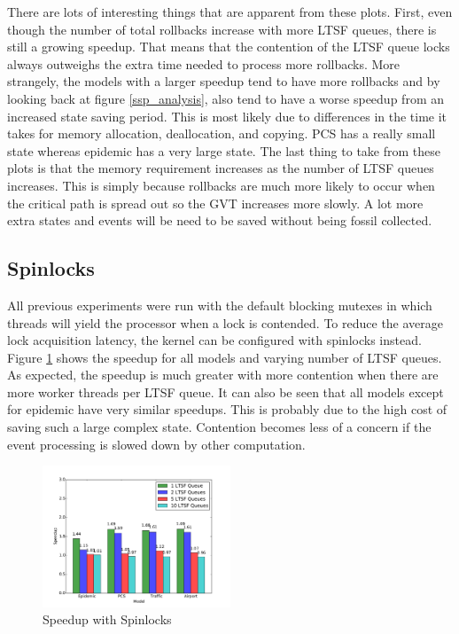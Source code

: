 \documentclass[11pt]{book}
\begin{document}
There are lots of interesting things that are apparent from these plots. First, even though
the number of total rollbacks increase with more LTSF queues, there is still a growing speedup.
That means that the contention of the LTSF queue locks always outweighs the extra time needed
to process more rollbacks. More strangely, the models with a larger speedup tend to have more
rollbacks and by looking back at figure \ref{ssp_analysis}, also tend to have a worse speedup
from an increased state saving period. This is most likely due to differences in the time it
takes for memory allocation, deallocation, and copying. PCS has a really small state whereas
epidemic has a very large state. The last thing to take from these plots is that the memory
requirement increases as the number of LTSF queues increases. This is simply because rollbacks
are much more likely to occur when the critical path is spread out so the GVT increases more
slowly. A lot more extra states and events will be need to be saved without being fossil collected.

\subsection{Spinlocks}

All previous experiments were run with the default blocking mutexes in which threads will yield
the processor when a lock is contended. To reduce the average lock acquisition latency, the
kernel can be configured with spinlocks instead. Figure \ref{spinlock_speedup} shows the speedup
for all models and varying number of LTSF queues. As expected, the speedup is much greater with
more contention when there are more worker threads per LTSF queue. It can also be seen that all
models except for epidemic have very similar speedups. This is probably due to the high cost
of saving such a large complex state. Contention becomes less of a concern if the event processing
is slowed down by other computation.

\begin{figure}
\centering
  \includegraphics[width=0.5\textwidth,quiet]{figs/pending_event_set/spinlock_speedup.pdf}
  \caption{Speedup with Spinlocks}\label{spinlock_speedup}
\end{figure}
\end{document}
